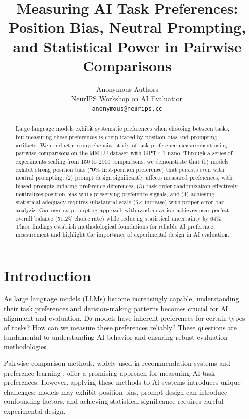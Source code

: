 \documentclass[11pt,a4paper]{article}
\title{Measuring AI Task Preferences: Position Bias, Neutral Prompting, and Statistical Power in Pairwise Comparisons}
\author{%
  Anonymous Authors\\
  NeurIPS Workshop on AI Evaluation\\
  \texttt{anonymous@neurips.cc} \\
}
\begin{document}
\maketitle

\begin{abstract}
Large language models exhibit systematic preferences when choosing between tasks, but measuring these preferences is complicated by position bias and prompting artifacts. We conduct a comprehensive study of task preference measurement using pairwise comparisons on the MMLU dataset with GPT-4.1-nano. Through a series of experiments scaling from 150 to 2000 comparisons, we demonstrate that (1) models exhibit strong position bias (70\% first-position preference) that persists even with neutral prompting, (2) prompt design significantly affects measured preferences, with biased prompts inflating preference differences, (3) task order randomization effectively neutralizes position bias while preserving preference signals, and (4) achieving statistical adequacy requires substantial scale (5× increase) with proper error bar analysis. Our neutral prompting approach with randomization achieves near-perfect overall balance (51.2\% choice rate) while reducing statistical uncertainty by 64\%. These findings establish methodological foundations for reliable AI preference measurement and highlight the importance of experimental design in AI evaluation.
\end{abstract}

\section{Introduction}

As large language models (LLMs) become increasingly capable, understanding their task preferences and decision-making patterns becomes crucial for AI alignment and evaluation. Do models have inherent preferences for certain types of tasks? How can we measure these preferences reliably? These questions are fundamental to understanding AI behavior and ensuring robust evaluation methodologies.

Pairwise comparison methods, widely used in recommendation systems and preference learning \cite{bradley1952rank}, offer a promising approach for measuring AI task preferences. However, applying these methods to AI systems introduces unique challenges: models may exhibit position bias, prompt design can introduce confounding factors, and achieving statistical significance requires careful experimental design.
\end{document}
